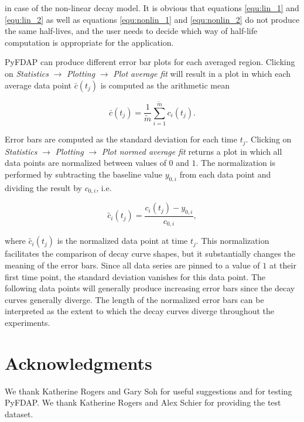 \documentclass[a4paper,11pt]{article}
\begin{document}
\noindent in case of the non-linear decay model. It is obvious that equations \ref{equ:lin_1} and \ref{equ:lin_2} as well as equations \ref{equ:nonlin_1} and \ref{equ:nonlin_2} do not produce the same half-lives, and the user needs to decide which way of half-life computation is appropriate for the application.

PyFDAP can produce different error bar plots for each averaged region. Clicking on \textit{Statistics} $\rightarrow$ \textit{Plotting} $\rightarrow$ \textit{Plot average fit} will result in a plot in which each average data point $\bar{c}(t_j)$ is computed as the arithmetic mean

\begin{equation*}
\bar{c}(t_j)=\frac{1}{\tilde{m}}\sum\limits_{i=1}^{\tilde{m}} c_i (t_j).
\end{equation*}

\noindent Error bars are computed as the standard deviation for each time $t_j$. Clicking on \textit{Statistics} $\rightarrow$ \textit{Plotting} $\rightarrow$ \textit{Plot normed average fit} returns a plot in which all data points are normalized between values of $0$ and $1$. The normalization is performed by subtracting the baseline value $y_{0,i}$ from each data point and dividing the result by $c_{0,i}$, i.e.

\begin{equation*}
\tilde{c_i}(t_j)= \frac{c_i (t_j)-y_{0,i}}{c_{0,i}},
\end{equation*}

\noindent where $\tilde{c_i}(t_j)$ is the normalized data point at time $t_j$. This normalization facilitates the comparison of decay curve shapes, but it substantially changes the meaning of the error bars. Since all data series are pinned to a value of $1$ at their first time point, the standard deviation vanishes for this data point. The following data points will generally produce increasing error bars since the decay curves generally diverge. The length of the normalized error bars can be interpreted as the extent to which the decay curves diverge throughout the experiments.

\section{Acknowledgments}
We thank Katherine Rogers and Gary Soh for useful suggestions and for testing PyFDAP. We thank Katherine Rogers and Alex Schier for providing the test dataset.

\pagebreak
\end{document}
